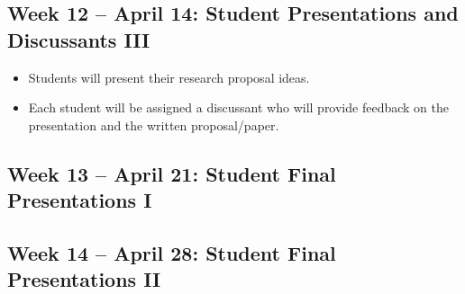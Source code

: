 \documentclass[11pt]{article}
\begin{document}
\subsection*{Week 12 -- April 14: Student Presentations and Discussants III}
\begin{itemize}
    \setlength{\itemsep}{0em}
    \item Students will present their research proposal ideas.
    \item Each student will be assigned a discussant who will provide feedback on the presentation and the written proposal/paper.
\end{itemize}

\subsection*{Week 13 -- April 21: Student Final Presentations I}

\subsection*{Week 14 -- April 28: Student Final Presentations II}
\end{document}
